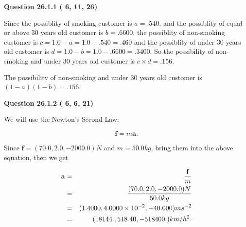 \documentclass[12pt]{article}
\begin{document}
\vspace{0.2in}
  
{\textbf{\Large{Question
26.1.1 
 (          6,         11,         26)
}}}
  
  
 
 
\noindent{}

Since the possiblity of  %
smoking customer is $ a =  %
.540 $,
and the possiblity of  %
equal or above 30 years old customer is $ b =  %
.6600 $,
the possiblity of  %
non-smoking customer is $ c = 1.0 - a = 1.0 -
.540
=  %
.460 $ and the possiblity of  %
under 30 years old
customer is $ d = 1.0 - b = 1.0 -  %
.6600 =  %
.3400  $.
So the possibility of  %
 non-smoking and  %
under 30 years old
customer is $ c \times d =  %
.156 $.
 
 
 
 
 
\noindent{}

The possibility of  %
 non-smoking and  %
under 30 years old
customer is $ (1-a)(1-b) =  %
.156 $.
 
 
  
\vspace{0.2in}
  
{\textbf{\Large{Question
26.1.2 
 (          6,          6,         21)
}}}
  
  
 
 
\noindent{}

We will use the Newton's Second Law:
 
\[
\mathbf{f}=m\mathbf{a}.
\]
 
Since $\mathbf{f}=( %
70.0,  %
2.0,  %
-2000.0 )N$
and $m= %
50.0 kg$, bring them into the above equation, then we get
 
\begin{eqnarray*}
\mathbf{a}&=&\frac{\mathbf{f}}m  \\
&=&\frac{(
70.0 ,
2.0 ,
-2000.0 )N
}{ %
50.0 kg}  \\
&=&(
1.4000 ,
4.0000 \times 10^{-2},
-40.000
)ms^{-2} \\
&=&(
18144. ,
518.40 ,
-518400.
)km/h^2.
\end{eqnarray*}
 
 
 
 
 
\noindent{}
\end{document}
